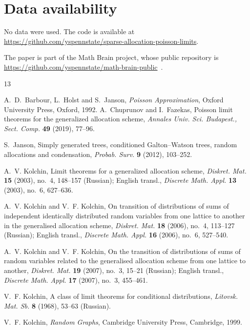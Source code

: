 \documentclass[11pt]{amsart}
\theoremstyle{definition}
\theoremstyle{remark}
\numberwithin{equation}{section}
\begin{document}
\section*{Data availability}
No data were used. The code is available at\\ \url{https://github.com/yspennstate/sparse-allocation-poisson-limits}.

The paper is part of the Math Brain project, whose public repository is \url{https://github.com/yspennstate/math-brain-public}~\cite{MathBrainRepo}.

\begin{thebibliography}{13}

A.~D.~Barbour, L.~Holst and S.~Janson, \emph{Poisson Approximation}, Oxford University Press, Oxford, 1992.
A.~Chuprunov and I.~Fazekas, Poisson limit theorems for the generalized allocation scheme, \emph{Annales Univ. Sci. Budapest., Sect. Comp.} \textbf{49} (2019), 77--96.

S.~Janson, Simply generated trees, conditioned Galton--Watson trees, random allocations and condensation, \emph{Probab. Surv.} \textbf{9} (2012), 103--252.

A.~V. Kolchin, Limit theorems for a generalized allocation scheme, \emph{Diskret. Mat.} \textbf{15} (2003), no.~4, 148--157 (Russian); English transl., \emph{Discrete Math. Appl.} \textbf{13} (2003), no.~6, 627--636.

A.~V. Kolchin and V.~F. Kolchin, On transition of distributions of sums of independent identically distributed random variables from one lattice to another in the generalised allocation scheme, \emph{Diskret. Mat.} \textbf{18} (2006), no.~4, 113--127 (Russian); English transl., \emph{Discrete Math. Appl.} \textbf{16} (2006), no.~6, 527--540.

A.~V. Kolchin and V.~F. Kolchin, On the transition of distributions of sums of random variables related to the generalised allocation scheme from one lattice to another, \emph{Diskret. Mat.} \textbf{19} (2007), no.~3, 15--21 (Russian); English transl., \emph{Discrete Math. Appl.} \textbf{17} (2007), no.~3, 455--461.

V.~F. Kolchin, A class of limit theorems for conditional distributions, \emph{Litovsk. Mat. Sb.} \textbf{8} (1968), 53--63 (Russian).

V.~F. Kolchin, \emph{Random Graphs}, Cambridge University Press, Cambridge, 1999.


\end{thebibliography}
\end{document}
